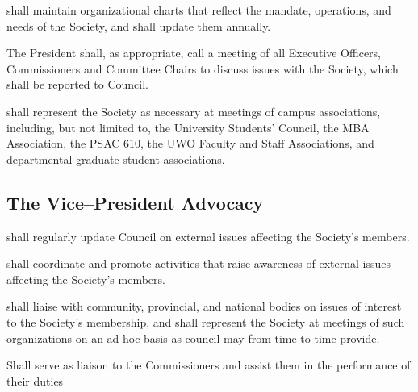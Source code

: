 \begin{longenum}[ label*=\thesubsection.\arabic*., align=left]
    \item shall maintain organizational charts that reflect the mandate, operations, and needs of the Society, and shall update them annually. 
    \item The President shall, as appropriate, call a meeting of all Executive Officers, Commissioners and Committee Chairs to discuss issues with the Society, which shall be reported to Council.
        \item shall represent the Society as necessary at meetings of campus associations, including, but not limited to, the University Students' Council, the MBA Association, the PSAC 610, the UWO Faculty and Staff Associations, and departmental graduate student associations. 
            
\end{longenum}

\subsection {The Vice--President Advocacy}
\begin{longenum}[ label*=\thesubsection.\arabic*., align=left]
	\item shall regularly update Council on external issues affecting the Society's members.
    \item shall coordinate and promote activities that raise awareness of external issues affecting the Society's members.
    \item shall liaise with community, provincial, and national bodies on issues of interest to the Society's membership, and shall represent the Society at meetings of such organizations on an ad hoc basis as council may from time to time provide.
\item Shall serve as liaison to the Commissioners and assist them in the performance of their duties  

\end{longenum}


